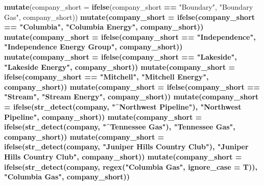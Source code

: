 \documentclass[]{article}
\newenvironment{Shaded}{\begin{snugshade}}{\end{snugshade}}
\newcommand{\KeywordTok}[1]{\textcolor[rgb]{0.13,0.29,0.53}{\textbf{#1}}}
\newcommand{\DataTypeTok}[1]{\textcolor[rgb]{0.13,0.29,0.53}{#1}}
\newcommand{\StringTok}[1]{\textcolor[rgb]{0.31,0.60,0.02}{#1}}
\newcommand{\OperatorTok}[1]{\textcolor[rgb]{0.81,0.36,0.00}{\textbf{#1}}}
\newcommand{\NormalTok}[1]{#1}
\begin{document}
\begin{Shaded}
\begin{Highlighting}[]
{{{{{{{{{{{{{{{{{{{{{{{{{{{{{{{{{{{{{{{{{{{{{{{{{{{\StringTok{  }\KeywordTok{mutate}\NormalTok{(}\DataTypeTok{company_short =} \KeywordTok{ifelse}\NormalTok{(company_short }\OperatorTok{==}\StringTok{ "Boundary"}\NormalTok{, }\StringTok{"Boundary Gas"}\NormalTok{, company_short)) }\OperatorTok{%
\StringTok{  }\KeywordTok{mutate}\NormalTok{(}\DataTypeTok{company_short =} \KeywordTok{ifelse}\NormalTok{(company_short }\OperatorTok{==}\StringTok{ "Columbia"}\NormalTok{, }\StringTok{"Columbia Energy"}\NormalTok{, company_short)) }\OperatorTok{%
\StringTok{  }\KeywordTok{mutate}\NormalTok{(}\DataTypeTok{company_short =} \KeywordTok{ifelse}\NormalTok{(company_short }\OperatorTok{==}\StringTok{ "Independence"}\NormalTok{, }\StringTok{"Independence Energy Group"}\NormalTok{, company_short)) }\OperatorTok{%
\StringTok{  }\KeywordTok{mutate}\NormalTok{(}\DataTypeTok{company_short =} \KeywordTok{ifelse}\NormalTok{(company_short }\OperatorTok{==}\StringTok{ "Lakeside"}\NormalTok{, }\StringTok{"Lakeside Energy"}\NormalTok{, company_short)) }\OperatorTok{%
\StringTok{  }\KeywordTok{mutate}\NormalTok{(}\DataTypeTok{company_short =} \KeywordTok{ifelse}\NormalTok{(company_short }\OperatorTok{==}\StringTok{ "Mitchell"}\NormalTok{, }\StringTok{"Mitchell Energy"}\NormalTok{, company_short)) }\OperatorTok{%
\StringTok{  }\KeywordTok{mutate}\NormalTok{(}\DataTypeTok{company_short =} \KeywordTok{ifelse}\NormalTok{(company_short }\OperatorTok{==}\StringTok{ "Stream"}\NormalTok{, }\StringTok{"Stream Energy"}\NormalTok{, company_short))}\OperatorTok{%
\StringTok{  }\KeywordTok{mutate}\NormalTok{(}\DataTypeTok{company_short =} \KeywordTok{ifelse}\NormalTok{(}\KeywordTok{str_detect}\NormalTok{(company, }\StringTok{"^Northwest Pipeline"}\NormalTok{), }\StringTok{"Northwest Pipeline"}\NormalTok{, company_short))}\OperatorTok{%
\StringTok{  }\KeywordTok{mutate}\NormalTok{(}\DataTypeTok{company_short =} \KeywordTok{ifelse}\NormalTok{(}\KeywordTok{str_detect}\NormalTok{(company, }\StringTok{"^Tennessee Gas"}\NormalTok{), }\StringTok{"Tennessee Gas"}\NormalTok{, company_short))}\OperatorTok{%
\StringTok{  }\KeywordTok{mutate}\NormalTok{(}\DataTypeTok{company_short =} \KeywordTok{ifelse}\NormalTok{(}\KeywordTok{str_detect}\NormalTok{(company, }\StringTok{"Juniper Hills Country Club"}\NormalTok{), }\StringTok{"Juniper Hills Country Club"}\NormalTok{, company_short))}\OperatorTok{%
\StringTok{    }\KeywordTok{mutate}\NormalTok{(}\DataTypeTok{company_short =} \KeywordTok{ifelse}\NormalTok{(}\KeywordTok{str_detect}\NormalTok{(company, }\KeywordTok{regex}\NormalTok{(}\StringTok{"Columbia Gas"}\NormalTok{, }\DataTypeTok{ignore_case =}\NormalTok{ T)), }\StringTok{"Columbia Gas"}\NormalTok{, company_short))}\OperatorTok{%
}}}}}}}}}}}}}}}}}}}}}}}}}}}}}}}}}}}}}}}}}}}}}}}}}}}}}}}}}}}}}
\end{Highlighting}
\end{Shaded}
\end{document}
